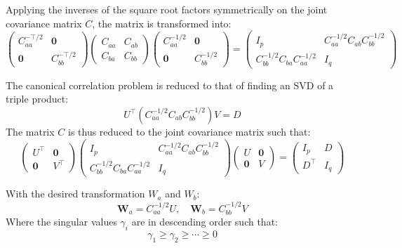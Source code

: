 Applying the inverses of the square root factors symmetrically on the joint covariance matrix $C$, the matrix is transformed into:
\begin{equation}
\begin{pmatrix}
    C_{aa}^{-\top/2} & {\mathbf 0}\\
    {\mathbf 0} & C_{bb}^{-\top/2}
    \end{pmatrix}
    \begin{pmatrix}
    C_{aa} & C_{ab}\\
    C_{ba} & C_{bb}
    \end{pmatrix}
    \begin{pmatrix}
    C_{aa}^{-1/2} & {\mathbf 0}\\
    {\mathbf 0} & C_{bb}^{-1/2}
    \end{pmatrix}
    =
    \begin{pmatrix}
    I_p & C_{aa}^{-1/2}C_{ab}C_{bb}^{-1/2}\\
    C_{bb}^{-1/2}C_{ba}C_{aa}^{-1/2} & I_q
\end{pmatrix}
\end{equation}

The canonical correlation problem is reduced to that of finding an SVD of a triple product:
\begin{equation}
    U^{\top} (C_{aa}^{-1/2}C_{ab}C_{bb}^{-1/2}) V = D
\end{equation}
The matrix $C$ is thus reduced to the joint covariance matrix such that:
\begin{equation}
    \begin{pmatrix}
        U^\top & {\mathbf 0}\\
        {\mathbf 0} & V^\top
    \end{pmatrix}
    \begin{pmatrix}
        I_p & C_{aa}^{-1/2}C_{ab}C_{bb}^{-1/2}\\
        C_{bb}^{-1/2}C_{ba}C_{aa}^{-1/2} & I_q
    \end{pmatrix}
    \begin{pmatrix}
        U & {\mathbf 0}\\
        {\mathbf 0} & V
    \end{pmatrix} =
    \begin{pmatrix}
    I_p & D\\
    D^\top & I_q
    \end{pmatrix}
\end{equation}

With the desired transformation $W_a$ and $W_b$:
\begin{equation}
    \mathbf{W}_a = C_{aa}^{-1/2} U, \quad \mathbf{W}_b = C_{bb}^{-1/2}V
\end{equation}
Where the singular values $\gamma_i$ are in descending order such that:
\begin{equation}
    \gamma_1 \geq \gamma_2 \geq \cdots \geq 0
\end{equation}

